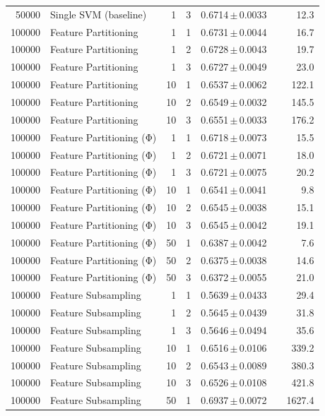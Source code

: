 \begin{table}[ht]
\begin{tabular}{rlrrccr}
50000 & Single SVM (baseline) & 1 & 3 & 0.6714\,$\pm$\,0.0033 &  & 12.3 \\
100000 & Feature Partitioning & 1 & 1 & 0.6731\,$\pm$\,0.0044 &  & 16.7 \\
100000 & Feature Partitioning & 1 & 2 & 0.6728\,$\pm$\,0.0043 &  & 19.7 \\
100000 & Feature Partitioning & 1 & 3 & 0.6727\,$\pm$\,0.0049 &  & 23.0 \\
100000 & Feature Partitioning & 10 & 1 & 0.6537\,$\pm$\,0.0062 &  & 122.1 \\
100000 & Feature Partitioning & 10 & 2 & 0.6549\,$\pm$\,0.0032 &  & 145.5 \\
100000 & Feature Partitioning & 10 & 3 & 0.6551\,$\pm$\,0.0033 &  & 176.2 \\
100000 & Feature Partitioning (Φ) & 1 & 1 & 0.6718\,$\pm$\,0.0073 &  & 15.5 \\
100000 & Feature Partitioning (Φ) & 1 & 2 & 0.6721\,$\pm$\,0.0071 &  & 18.0 \\
100000 & Feature Partitioning (Φ) & 1 & 3 & 0.6721\,$\pm$\,0.0075 &  & 20.2 \\
100000 & Feature Partitioning (Φ) & 10 & 1 & 0.6541\,$\pm$\,0.0041 &  & 9.8 \\
100000 & Feature Partitioning (Φ) & 10 & 2 & 0.6545\,$\pm$\,0.0038 &  & 15.1 \\
100000 & Feature Partitioning (Φ) & 10 & 3 & 0.6545\,$\pm$\,0.0042 &  & 19.1 \\
100000 & Feature Partitioning (Φ) & 50 & 1 & 0.6387\,$\pm$\,0.0042 &  & 7.6 \\
100000 & Feature Partitioning (Φ) & 50 & 2 & 0.6375\,$\pm$\,0.0038 &  & 14.6 \\
100000 & Feature Partitioning (Φ) & 50 & 3 & 0.6372\,$\pm$\,0.0055 &  & 21.0 \\
100000 & Feature Subsampling & 1 & 1 & 0.5639\,$\pm$\,0.0433 &  & 29.4 \\
100000 & Feature Subsampling & 1 & 2 & 0.5645\,$\pm$\,0.0439 &  & 31.8 \\
100000 & Feature Subsampling & 1 & 3 & 0.5646\,$\pm$\,0.0494 &  & 35.6 \\
100000 & Feature Subsampling & 10 & 1 & 0.6516\,$\pm$\,0.0106 &  & 339.2 \\
100000 & Feature Subsampling & 10 & 2 & 0.6543\,$\pm$\,0.0089 &  & 380.3 \\
100000 & Feature Subsampling & 10 & 3 & 0.6526\,$\pm$\,0.0108 &  & 421.8 \\
100000 & Feature Subsampling & 50 & 1 & 0.6937\,$\pm$\,0.0072 &  & 1627.4 \\

\end{tabular}
\end{table}
